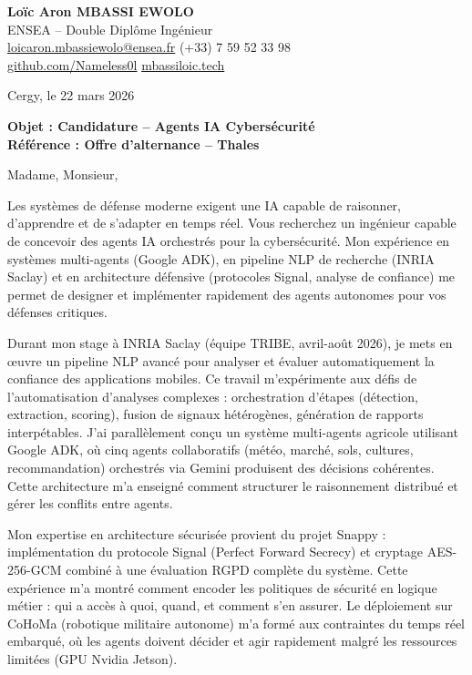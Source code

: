 \documentclass[a4paper,11pt]{article}
\begin{document}
\noindent
\textbf{Loïc Aron MBASSI EWOLO} \\
ENSEA -- Double Diplôme Ingénieur \\
\href{mailto:loicaron.mbassiewolo@ensea.fr}{loicaron.mbassiewolo@ensea.fr} \quad (+33) 7 59 52 33 98 \\
\href{https://github.com/Nameless0l}{github.com/Nameless0l} \quad \href{https://mbassiloic.tech}{mbassiloic.tech}

\vspace{1em}
\noindent Cergy, le 22 mars 2026

\vspace{1em}
\noindent
\textbf{Objet : Candidature -- Agents IA Cybersécurité} \\
\textbf{Référence : Offre d'alternance -- Thales}

\vspace{1.5em}
\noindent Madame, Monsieur,

\vspace{0.8em}
Les systèmes de défense moderne exigent une IA capable de raisonner, d'apprendre et de s'adapter en temps réel. Vous recherchez un ingénieur capable de concevoir des agents IA orchestrés pour la cybersécurité. Mon expérience en systèmes multi-agents (Google ADK), en pipeline NLP de recherche (INRIA Saclay) et en architecture défensive (protocoles Signal, analyse de confiance) me permet de designer et implémenter rapidement des agents autonomes pour vos défenses critiques.

\vspace{0.8em}
Durant mon stage à INRIA Saclay (équipe TRIBE, avril-août 2026), je mets en œuvre un pipeline NLP avancé pour analyser et évaluer automatiquement la confiance des applications mobiles. Ce travail m'expérimente aux défis de l'automatisation d'analyses complexes : orchestration d'étapes (détection, extraction, scoring), fusion de signaux hétérogènes, génération de rapports interpétables. J'ai parallèlement conçu un système multi-agents agricole utilisant Google ADK, où cinq agents collaboratifs (météo, marché, sols, cultures, recommandation) orchestrés via Gemini produisent des décisions cohérentes. Cette architecture m'a enseigné comment structurer le raisonnement distribué et gérer les conflits entre agents.

\vspace{0.8em}
Mon expertise en architecture sécurisée provient du projet Snappy : implémentation du protocole Signal (Perfect Forward Secrecy) et cryptage AES-256-GCM combiné à une évaluation RGPD complète du système. Cette expérience m'a montré comment encoder les politiques de sécurité en logique métier : qui a accès à quoi, quand, et comment s'en assurer. Le déploiement sur CoHoMa (robotique militaire autonome) m'a formé aux contraintes du temps réel embarqué, où les agents doivent décider et agir rapidement malgré les ressources limitées (GPU Nvidia Jetson).
\end{document}

